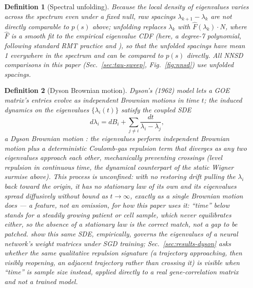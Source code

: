 \documentclass[11pt]{article}
\newtheorem{definition}{Definition}
\begin{document}
\begin{definition}[Spectral unfolding]
Because the local density of eigenvalues varies across the spectrum
even under a fixed null, raw spacings $\lambda_{k+1}-\lambda_k$ are not
directly comparable to $p(s)$ above; unfolding replaces $\lambda_k$ with
$\hat F(\lambda_k)\cdot N$, where $\hat F$ is a smooth fit to the
empirical eigenvalue CDF (here, a degree-7 polynomial, following
standard RMT practice and \citealp{luo2007}), so that the unfolded
spacings have mean 1 everywhere in the spectrum and can be compared to
$p(s)$ directly. All NNSD comparisons in this paper (Sec.~\ref{sec:tau-sweep},
Fig.~\ref{fig:nnsd}) use unfolded spacings.
\end{definition}

\begin{definition}[Dyson Brownian motion]
\label{def:dyson-sde}
Dyson's (1962) model lets a GOE matrix's entries evolve as independent
Brownian motions in time $t$; the induced dynamics on the eigenvalues
$\{\lambda_i(t)\}$ satisfy the coupled SDE
\[
d\lambda_i = dB_i + \sum_{j\neq i}\frac{dt}{\lambda_i-\lambda_j},
\]
a Dyson Brownian motion \citep{dyson1962}: the eigenvalues perform
independent Brownian motion \emph{plus} a deterministic
Coulomb-gas repulsion term that diverges as any two eigenvalues
approach each other, mechanically preventing crossings (level
repulsion in continuous time, the dynamical counterpart of the static
Wigner surmise above). This process is unconfined: with no restoring
drift pulling the $\lambda_i$ back toward the origin, it has no
stationary law of its own and its eigenvalues spread diffusively
without bound as $t\to\infty$, exactly as a single Brownian motion does
--- a feature, not an omission, for how this paper uses it: ``time''
below stands for a steadily growing patient or cell sample, which never
equilibrates either, so the absence of a stationary law is the correct
match, not a gap to be patched. \citet{aarts2024} show this same SDE,
empirically, governs the eigenvalues of a neural network's weight
matrices under SGD training; Sec.~\ref{sec:results-dyson} asks whether
the same qualitative repulsion signature (a trajectory approaching,
then visibly reopening, an adjacent trajectory rather than crossing it)
is visible when ``time'' is sample size instead, applied directly to a
real gene-correlation matrix and not a trained model.
\end{definition}
\end{document}
